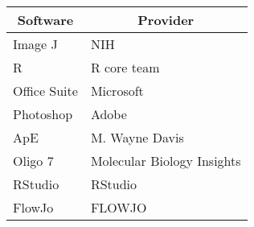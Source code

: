 \setlongtables\begin{longtable}{ll}\hline\hline
\multicolumn{1}{c}{Software}&\multicolumn{1}{c}{Provider}\tabularnewline
\hline
\endhead
\hline
\endfoot
Image J&NIH\tabularnewline
R&R core team\tabularnewline
Office Suite&Microsoft\tabularnewline
Photoshop&Adobe\tabularnewline
ApE&M. Wayne Davis\tabularnewline
Oligo 7&Molecular Biology Insights\tabularnewline
RStudio&RStudio\tabularnewline
FlowJo&FLOWJO\tabularnewline
\hline
\end{longtable}
